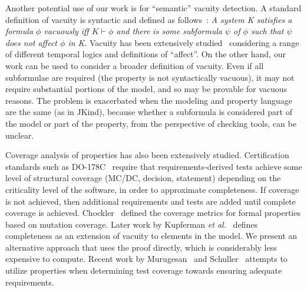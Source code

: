 Another potential use of our work is for ``semantic'' vacuity detection.  A standard definition of vacuity is syntactic and defined as follows~\cite{Kupferman:2006:SCF}: {\em A system K satisfies a formula $\phi$ vacuously iff $K \vdash \phi$ and there is some subformula $\psi$ of $\phi$ such that $\psi$ does not affect $\phi$ in K}.  Vacuity has been extensively studied~\cite{Gurfinkel:2012:RVB,Chockler2008,DBLP:Ben-DavidK13,Kupferman:2006:SCF,Chockler:2007,Beer1997} considering a range of different temporal logics and definitions of ``affect''.  On the other hand, our work can be used to consider a broader definition of vacuity.  Even if all subformulae are required (the property is not syntactically vacuous), it may not require substantial portions of the model, and so may be provable for vacuous reasons.  The problem is exacerbated when the modeling and property language are the same (as in JKind), because whether a subformula is considered part of the model or part of the property, from the perspective of checking tools, can be unclear.

Coverage analysis of properties has also been extensively studied. Certification standards such as DO-178C~\cite{DO178C} require that requirements-derived tests achieve some level of structural coverage (MC/DC, decision, statement) depending on the criticality level of the software, in order to approximate completeness.  If coverage is not achieved, then additional requirements and tests are added until complete coverage is achieved.  Chockler~\cite{chockler_coverage_2003} defined the coverage metrics for formal properties based on mutation coverage.  Later work by Kupferman \textit{et al.}~\cite{Kupferman:2006:SCF} defines completeness as an extension of vacuity to elements in the model.  We present an alternative approach that uses the proof directly, which is considerably less expensive to compute.  Recent work by Murugesan~\cite{murugesan2015we} and Schuller~\cite{schuler_assessing_2011} attempts to utilize properties when determining test coverage towards ensuring adequate requirements.




\iffalse
\begin{itemize}
    \item MUS's : checked
    \item Work on Alloy: checked
    \item Work that Teme pointed us to : will be added
    \item Anything else Elaheh has found : \%60 checked
\end{itemize}
\fi

